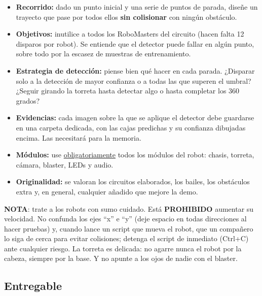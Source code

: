 \documentclass[12pt,a4paper]{article}
\begin{document}
\begin{itemize}
    \item \textbf{Recorrido:} dado un punto inicial y una serie de puntos de parada, diseñe un trayecto que pase por todos ellos \textbf{sin colisionar} con ningún obstáculo.
    \item \textbf{Objetivos:} inutilice a todos los RoboMasters del circuito (hacen falta 12 disparos por robot). Se entiende que el detector puede fallar en algún punto, sobre todo por la escasez de muestras de entrenamiento.
    \item \textbf{Estrategia de detección:} piense bien qué hacer en cada parada. ¿Disparar solo a la detección de mayor confianza o a todas las que superen el umbral? ¿Seguir girando la torreta hasta detectar algo o hasta completar los 360 grados?
    \item \textbf{Evidencias:} cada imagen sobre la que se aplique el detector debe guardarse en una carpeta dedicada, con las cajas predichas y su confianza dibujadas encima. Las necesitará para la memoria.
    \item \textbf{Módulos:} use \underline{obligatoriamente} todos los módulos del robot: chasis, torreta, cámara, blaster, LEDs y audio.
    \item \textbf{Originalidad:} se valoran los circuitos elaborados, los bailes, los obstáculos extra y, en general, cualquier añadido que mejore la demo.
\end{itemize}

\begin{framed}
    \textbf{NOTA}: trate a los robots con sumo cuidado. Está \textbf{PROHIBIDO} aumentar su velocidad. No confunda los ejes ``x'' e ``y'' (deje espacio en todas direcciones al hacer pruebas) y, cuando lance un script que mueva el robot, que un compañero lo siga de cerca para evitar colisiones; detenga el script de inmediato (Ctrl+C) ante cualquier riesgo. La torreta es delicada: no agarre nunca el robot por la cabeza, siempre por la base. Y no apunte a los ojos de nadie con el blaster.
\end{framed}

\subsection{Entregable}
\label{sec:semana3-entregable}
\end{document}
